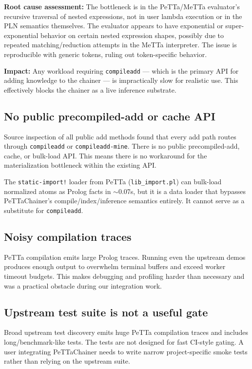 \documentclass[11pt]{article}
\begin{document}
\textbf{Root cause assessment:} The bottleneck is in the PeTTa/MeTTa evaluator's
recursive traversal of nested expressions, not in user lambda execution or in the
PLN semantics themselves. The evaluator appears to have exponential or
super-exponential behavior on certain nested expression shapes, possibly due to
repeated matching/reduction attempts in the MeTTa interpreter. The issue is
reproducible with generic tokens, ruling out token-specific behavior.

\textbf{Impact:} Any workload requiring \texttt{compileadd} --- which is the
primary API for adding knowledge to the chainer --- is impractically slow for
realistic use. This effectively blocks the chainer as a live inference substrate.

\subsection{No public precompiled-add or cache API}

Source inspection of all public add methods found that every add path routes
through \texttt{compileadd} or \texttt{compileadd-mine}. There is no public
precompiled-add, cache, or bulk-load API. This means there is no workaround for
the materialization bottleneck within the existing API.

The \texttt{static-import!} loader from PeTTa (\texttt{lib\_import.pl}) can
bulk-load normalized atoms as Prolog facts in $\sim$0.07s, but it is a data loader
that bypasses PeTTaChainer's compile/index/inference semantics entirely. It
cannot serve as a substitute for \texttt{compileadd}.

\subsection{Noisy compilation traces}

PeTTa compilation emits large Prolog traces. Running even the upstream demos
produces enough output to overwhelm terminal buffers and exceed worker timeout
budgets. This makes debugging and profiling harder than necessary and was a
practical obstacle during our integration work.

\subsection{Upstream test suite is not a useful gate}

Broad upstream test discovery emits huge PeTTa compilation traces and includes
long/benchmark-like tests. The tests are not designed for fast CI-style gating.
A user integrating PeTTaChainer needs to write narrow project-specific smoke
tests rather than relying on the upstream suite.
\end{document}
